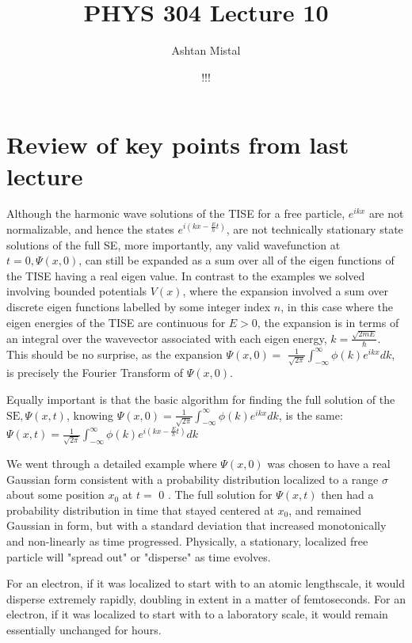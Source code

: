 \documentclass{article}
\title{PHYS 304 Lecture 10}
\author{Ashtan Mistal}
\date{!!!}
\begin{document}
\ifstandalone
\maketitle
\fi

\graphicspath{{./Lecture10/}}

\section{Review of key points from last lecture}

Although the harmonic wave solutions of the TISE for a free particle, $e^{i k x}$ are not normalizable, and hence the states $e^{i\left(k x-\frac{E}{h} t\right)}$, are not technically stationary state solutions of the full SE, more importantly, any valid wavefunction at $t=0, \Psi(x, 0)$, can still be expanded as a sum over all of the eigen functions of the TISE having a real eigen value. In contrast to the examples we solved involving bounded potentials $V(x)$, where the expansion involved a sum over discrete eigen functions labelled by some integer index $n$, in this case where the eigen energies of the TISE are continuous for $E>0$, the expansion is in terms of an integral over the wavevector associated with each eigen energy, $k=\frac{\sqrt{2 m E}}{\hbar} .$ This should be no surprise, as the expansion $\Psi(x, 0)=$ $\frac{1}{\sqrt{2 \pi}} \int_{-\infty}^{\infty} \phi(k) e^{i k x} d k$, is precisely the Fourier Transform of $\Psi(x, 0)$.

Equally important is that the basic algorithm for finding the full solution of the $\mathrm{SE}, \Psi(x, t)$, knowing $\Psi(x, 0)=\frac{1}{\sqrt{2 \pi}} \int_{-\infty}^{\infty} \phi(k) e^{i k x} d k$, is the same: $\Psi(x, t)=\frac{1}{\sqrt{2 \pi}} \int_{-\infty}^{\infty} \phi(k) e^{i\left(k x-\frac{E}{h} t\right)} d k$

We went through a detailed example where $\Psi(x, 0)$ was chosen to have a real Gaussian form consistent with a probability distribution localized to a range $\sigma$ about some position $x_{0}$ at $t=$ 0 . The full solution for $\Psi(x, t)$ then had a probability distribution in time that stayed centered at $x_{0}$, and remained Gaussian in form, but with a standard deviation that increased monotonically and non-linearly as time progressed. Physically, a stationary, localized free particle will "spread out" or "disperse" as time evolves.

For an electron, if it was localized to start with to an atomic lengthscale, it would disperse extremely rapidly, doubling in extent in a matter of femtoseconds.
For an electron, if it was localized to start with to a laboratory scale, it would remain essentially unchanged for hours.
\end{document}
